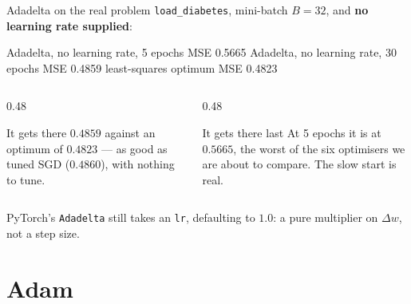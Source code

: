 \documentclass[aspectratio=169]{beamer}
\begin{document}
\begin{frame}[fragile]{Adadelta on the real problem}
\texttt{load\_diabetes}, mini-batch $B=32$, and \textbf{no learning rate
supplied}:
\begin{outblk}
Adadelta, no learning rate,  5 epochs   MSE 0.5665
Adadelta, no learning rate, 30 epochs   MSE 0.4859
least-squares optimum                    MSE 0.4823
\end{outblk}
\begin{columns}[T]
  \begin{column}{0.48\textwidth}
    \begin{exampleblock}{It gets there}
      \small $0.4859$ against an optimum of $0.4823$ --- as good as tuned SGD
      ($0.4860$), with nothing to tune.
    \end{exampleblock}
  \end{column}
  \begin{column}{0.48\textwidth}
    \begin{alertblock}{It gets there last}
      \small At 5 epochs it is at $0.5665$, the worst of the six optimisers we
      are about to compare. The slow start is real.
    \end{alertblock}
  \end{column}
\end{columns}
\begin{center}\small
  PyTorch's \texttt{Adadelta} still takes an \texttt{lr}, defaulting to $1.0$:
  a pure multiplier on $\Delta w$, not a step size.
\end{center}
\end{frame}

\section{Adam}
\label{sec:adam}
\end{document}
